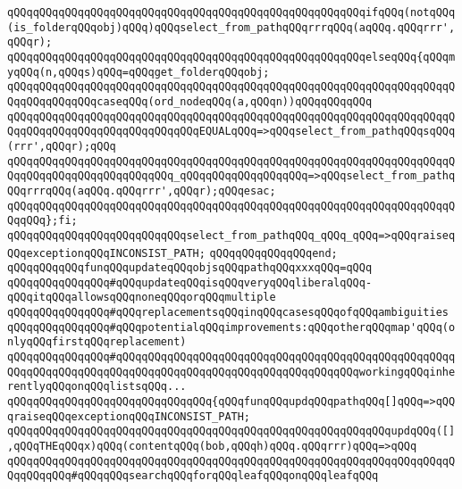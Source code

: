 \verb|qQQqqQQqqQQqqQQqqQQqqQQqqQQqqQQqqQQqqQQqqQQqqQQqqQQqqQQqifqQQq(notqQQq(is_folderqQQqobj)qQQq)qQQqselect_from_pathqQQqrrrqQQq(aqQQq.qQQqrrr',qQQqr);|\newline
\verb|qQQqqQQqqQQqqQQqqQQqqQQqqQQqqQQqqQQqqQQqqQQqqQQqqQQqqQQqelseqQQq{qQQqmyqQQq(n,qQQqs)qQQq=qQQqget_folderqQQqobj;|\newline
\verb|qQQqqQQqqQQqqQQqqQQqqQQqqQQqqQQqqQQqqQQqqQQqqQQqqQQqqQQqqQQqqQQqqQQqqQQqqQQqqQQqqQQqcaseqQQq(ord_nodeqQQq(a,qQQqn))qQQqqQQqqQQq|\newline
\verb|qQQqqQQqqQQqqQQqqQQqqQQqqQQqqQQqqQQqqQQqqQQqqQQqqQQqqQQqqQQqqQQqqQQqqQQqqQQqqQQqqQQqqQQqqQQqqQQqqQQqEQUALqQQq=>qQQqselect_from_pathqQQqsqQQq(rrr',qQQqr);qQQq|\newline
\verb|qQQqqQQqqQQqqQQqqQQqqQQqqQQqqQQqqQQqqQQqqQQqqQQqqQQqqQQqqQQqqQQqqQQqqQQqqQQqqQQqqQQqqQQqqQQqqQQq_qQQqqQQqqQQqqQQqqQQq=>qQQqselect_from_pathqQQqrrrqQQq(aqQQq.qQQqrrr',qQQqr);qQQqesac;|\newline
\verb|qQQqqQQqqQQqqQQqqQQqqQQqqQQqqQQqqQQqqQQqqQQqqQQqqQQqqQQqqQQqqQQqqQQqqQQqqQQq};fi;|\newline
\verb|qQQqqQQqqQQqqQQqqQQqqQQqqQQqselect_from_pathqQQq_qQQq_qQQq=>qQQqraiseqQQqexceptionqQQqINCONSIST_PATH;|\newline
\verb|qQQqqQQqqQQqqQQqend;|\newline
\newline
\newline
\verb|qQQqqQQqqQQqfunqQQqupdateqQQqobjsqQQqpathqQQqxxxqQQq=qQQq|\newline
\verb|qQQqqQQqqQQqqQQq#qQQqupdateqQQqisqQQqveryqQQqliberalqQQq-qQQqitqQQqallowsqQQqnoneqQQqorqQQqmultiple|\newline
\verb|qQQqqQQqqQQqqQQq#qQQqreplacementsqQQqinqQQqcasesqQQqofqQQqambiguities|\newline
\verb|qQQqqQQqqQQqqQQq#qQQqpotentialqQQqimprovements:qQQqotherqQQqmap'qQQq(onlyqQQqfirstqQQqreplacement)|\newline
\verb|qQQqqQQqqQQqqQQq#qQQqqQQqqQQqqQQqqQQqqQQqqQQqqQQqqQQqqQQqqQQqqQQqqQQqqQQqqQQqqQQqqQQqqQQqqQQqqQQqqQQqqQQqqQQqqQQqqQQqqQQqqQQqworkingqQQqinherentlyqQQqonqQQqlistsqQQq...|\newline
\verb|qQQqqQQqqQQqqQQqqQQqqQQqqQQqqQQq{qQQqfunqQQqupdqQQqpathqQQq[]qQQq=>qQQqraiseqQQqexceptionqQQqINCONSIST_PATH;|\newline
\verb|qQQqqQQqqQQqqQQqqQQqqQQqqQQqqQQqqQQqqQQqqQQqqQQqqQQqqQQqqQQqupdqQQq([],qQQqTHEqQQqx)qQQq(contentqQQq(bob,qQQqh)qQQq.qQQqrrr)qQQq=>qQQq|\newline
\verb|qQQqqQQqqQQqqQQqqQQqqQQqqQQqqQQqqQQqqQQqqQQqqQQqqQQqqQQqqQQqqQQqqQQqqQQqqQQqqQQq#qQQqqQQqsearchqQQqforqQQqleafqQQqonqQQqleafqQQq|\newline
